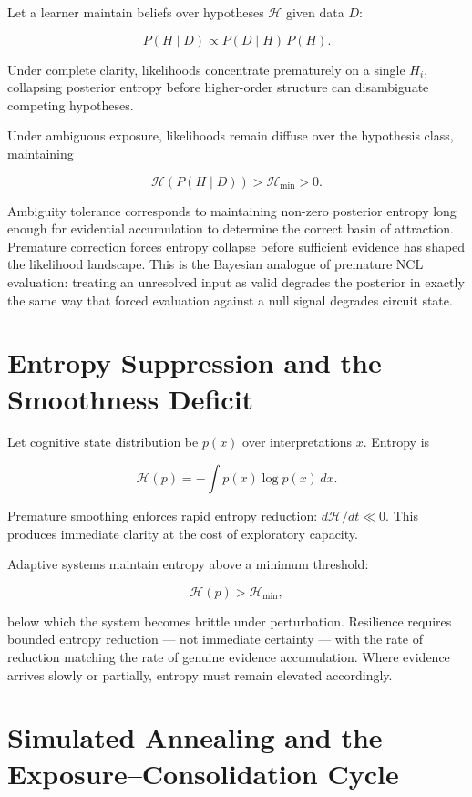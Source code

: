 \documentclass[11pt]{article}
\theoremstyle{remark}
\begin{document}
Let a learner maintain beliefs over hypotheses $\mathcal{H}$ given data $D$:

\[
P(H \mid D) \propto P(D \mid H)\, P(H).
\]

Under complete clarity, likelihoods concentrate prematurely on a single $H_i$, collapsing posterior entropy before higher-order structure can disambiguate competing hypotheses.

Under ambiguous exposure, likelihoods remain diffuse over the hypothesis class, maintaining

\[
\mathcal{H}(P(H \mid D)) > \mathcal{H}_{\min} > 0.
\]

Ambiguity tolerance corresponds to maintaining non-zero posterior entropy long enough for evidential accumulation to determine the correct basin of attraction. Premature correction forces entropy collapse before sufficient evidence has shaped the likelihood landscape. This is the Bayesian analogue of premature NCL evaluation: treating an unresolved input as valid degrades the posterior in exactly the same way that forced evaluation against a null signal degrades circuit state.

\section{Entropy Suppression and the Smoothness Deficit}
\label{app:entropy}

Let cognitive state distribution be $p(x)$ over interpretations $x$. Entropy is

\[
\mathcal{H}(p) = -\int p(x)\log p(x)\,dx.
\]

Premature smoothing enforces rapid entropy reduction: $d\mathcal{H}/dt \ll 0$. This produces immediate clarity at the cost of exploratory capacity.

Adaptive systems maintain entropy above a minimum threshold:

\[
\mathcal{H}(p) > \mathcal{H}_{\min},
\]

below which the system becomes brittle under perturbation. Resilience requires bounded entropy reduction — not immediate certainty — with the rate of reduction matching the rate of genuine evidence accumulation. Where evidence arrives slowly or partially, entropy must remain elevated accordingly.

\section{Simulated Annealing and the Exposure--Consolidation Cycle}
\label{app:annealing}
\end{document}
